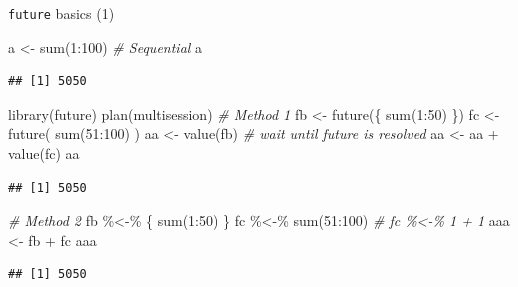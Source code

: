 \documentclass[
  ignorenonframetext,
  usenames,
  dvipsnames]{beamer}
\newenvironment{Shaded}{\begin{snugshade}}{\end{snugshade}}
\newcommand{\CommentTok}[1]{\textcolor[rgb]{0.56,0.35,0.01}{\textit{#1}}}
\newcommand{\DecValTok}[1]{\textcolor[rgb]{0.00,0.00,0.81}{#1}}
\newcommand{\FunctionTok}[1]{\textcolor[rgb]{0.00,0.00,0.00}{#1}}
\newcommand{\NormalTok}[1]{#1}
\newcommand{\OtherTok}[1]{\textcolor[rgb]{0.56,0.35,0.01}{#1}}
\newcommand{\SpecialCharTok}[1]{\textcolor[rgb]{0.00,0.00,0.00}{#1}}
\begin{document}
\begin{frame}[fragile]{\texttt{future} basics (1)}
\protect\hypertarget{future-basics-1}{}
\tiny

\begin{Shaded}
\begin{Highlighting}[]
\NormalTok{a }\OtherTok{\textless{}{-}} \FunctionTok{sum}\NormalTok{(}\DecValTok{1}\SpecialCharTok{:}\DecValTok{100}\NormalTok{) }\CommentTok{\# Sequential}
\NormalTok{a}
\end{Highlighting}
\end{Shaded}

\begin{verbatim}
## [1] 5050
\end{verbatim}

\begin{Shaded}
\begin{Highlighting}[]
\FunctionTok{library}\NormalTok{(future)}
\FunctionTok{plan}\NormalTok{(multisession)}
\CommentTok{\# Method 1}
\NormalTok{fb }\OtherTok{\textless{}{-}} \FunctionTok{future}\NormalTok{(\{ }\FunctionTok{sum}\NormalTok{(}\DecValTok{1}\SpecialCharTok{:}\DecValTok{50}\NormalTok{) \})}
\NormalTok{fc }\OtherTok{\textless{}{-}} \FunctionTok{future}\NormalTok{( }\FunctionTok{sum}\NormalTok{(}\DecValTok{51}\SpecialCharTok{:}\DecValTok{100}\NormalTok{) )}
\NormalTok{aa }\OtherTok{\textless{}{-}} \FunctionTok{value}\NormalTok{(fb) }\CommentTok{\# wait until future is resolved}
\NormalTok{aa }\OtherTok{\textless{}{-}}\NormalTok{ aa }\SpecialCharTok{+} \FunctionTok{value}\NormalTok{(fc)}
\NormalTok{aa}
\end{Highlighting}
\end{Shaded}

\begin{verbatim}
## [1] 5050
\end{verbatim}

\begin{Shaded}
\begin{Highlighting}[]
\CommentTok{\# Method 2}
\NormalTok{fb }\SpecialCharTok{\%\textless{}{-}\%}\NormalTok{ \{ }\FunctionTok{sum}\NormalTok{(}\DecValTok{1}\SpecialCharTok{:}\DecValTok{50}\NormalTok{) \}}
\NormalTok{fc }\SpecialCharTok{\%\textless{}{-}\%} \FunctionTok{sum}\NormalTok{(}\DecValTok{51}\SpecialCharTok{:}\DecValTok{100}\NormalTok{)}
\CommentTok{\# fc \%\textless{}{-}\% 1 + 1}
\NormalTok{aaa }\OtherTok{\textless{}{-}}\NormalTok{ fb }\SpecialCharTok{+}\NormalTok{ fc}
\NormalTok{aaa}
\end{Highlighting}
\end{Shaded}

\begin{verbatim}
## [1] 5050
\end{verbatim}

\normalsize
\end{frame}
\end{document}
